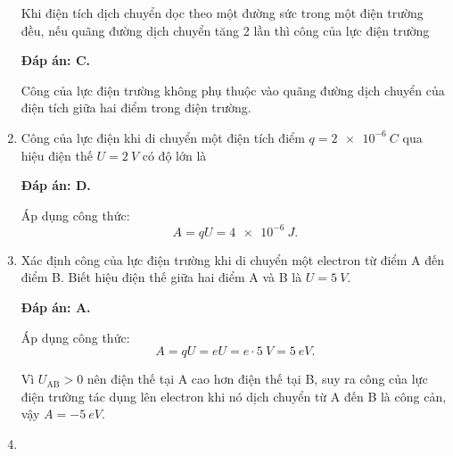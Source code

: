 \begin{enumerate}[label=\bfseries Câu \arabic*:]
	\cauhoi
	{Khi điện tích dịch chuyển dọc theo một đường sức trong một điện trường đều, nếu quãng đường dịch chuyển tăng 2 lần thì công của lực điện trường
		
	}
	\loigiai
	{	\textbf{Đáp án: C.}
		
		Công của lực điện trường không phụ thuộc vào quãng đường dịch chuyển của điện tích giữa hai điểm trong điện trường.
	}
	\item {}
	
	\cauhoi
	{Công của lực điện khi di chuyển một điện tích điểm $q=\SI{2e-6}{C}$ qua hiệu điện thế $U=\SI{2}{V}$ có độ lớn là
		
	}
	\loigiai
	{	\textbf{Đáp án: D.}
		
		Áp dụng công thức:
		$$A=qU=\SI{4e-6}{J}.$$
	}
	\item {}
	
	\cauhoi
	{Xác định công của lực điện trường khi di chuyển một electron từ điểm A đến điểm B. Biết hiệu điện thế giữa hai điểm A và B là $U=\SI{5}{V}$.
		
	}
	\loigiai
	{	\textbf{Đáp án: A.}
		
		Áp dụng công thức:
		$$A=qU=eU=e\cdot \SI{5}{V} = \SI{5}{eV}.$$
		
		Vì $U_\text{AB} > 0$ nên điện thế tại A cao hơn điện thế tại B, suy ra công của lực điện trường tác dụng lên electron khi nó dịch chuyển từ A đến B là công cản, vậy $A=\SI{-5}{eV}$.
	}
	\item {}
	

\end{enumerate}
